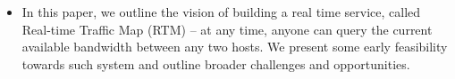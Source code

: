 {\begin{itemize}
	\item In this paper, we outline the vision of building a real time service, called Real-time Traffic Map (RTM) -- at any time, anyone can query the current available bandwidth between any two hosts. We present some early feasibility towards such system and outline broader challenges and opportunities.
\end{itemize}
}
